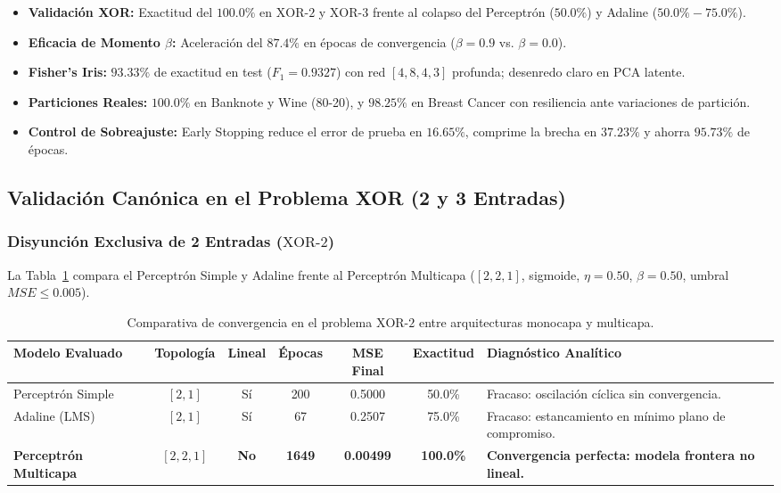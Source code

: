 \documentclass{article}
\begin{document}
\begin{takeawaybox}
\begin{itemize}
    \item \textbf{Validación XOR:} Exactitud del $100.0\%$ en $\text{XOR-2}$ y $\text{XOR-3}$ frente al colapso del Perceptrón ($50.0\%$) y Adaline ($50.0\%-75.0\%$).
    \item \textbf{Eficacia de Momento $\beta$:} Aceleración del $87.4\%$ en épocas de convergencia ($\beta=0.9$ vs. $\beta=0.0$).
    \item \textbf{Fisher's Iris:} $93.33\%$ de exactitud en test ($F_1=0.9327$) con red $[4, 8, 4, 3]$ profunda; desenredo claro en PCA latente.
    \item \textbf{Particiones Reales:} $100.0\%$ en Banknote y Wine (80-20), y $98.25\%$ en Breast Cancer con resiliencia ante variaciones de partición.
    \item \textbf{Control de Sobreajuste:} Early Stopping reduce el error de prueba en $16.65\%$, comprime la brecha en $37.23\%$ y ahorra $95.73\%$ de épocas.
\end{itemize}
\end{takeawaybox}

\subsection{Validación Canónica en el Problema XOR (2 y 3 Entradas)}

\subsubsection{Disyunción Exclusiva de 2 Entradas ($\text{XOR-2}$)}
La Tabla~\ref{tab:comp_xor2} compara el Perceptrón Simple y Adaline frente al Perceptrón Multicapa ($[2, 2, 1]$, sigmoide, $\eta = 0.50$, $\beta = 0.50$, umbral $MSE \le 0.005$).

\begin{table}[H]
\centering
\small
\caption{Comparativa de convergencia en el problema $\text{XOR-2}$ entre arquitecturas monocapa y multicapa.}
\label{tab:comp_xor2}
\begin{tabularx}{\textwidth}{l c c c c c X}
\toprule
\textbf{Modelo Evaluado} & \textbf{Topología} & \textbf{Lineal} & \textbf{Épocas} & \textbf{MSE Final} & \textbf{Exactitud} & \textbf{Diagnóstico Analítico} \\
\midrule
Perceptrón Simple & $[2, 1]$ & Sí & 200 & 0.5000 & 50.0\% & Fracaso: oscilación cíclica sin convergencia. \\
\addlinespace
Adaline (LMS) & $[2, 1]$ & Sí & 67 & 0.2507 & 75.0\% & Fracaso: estancamiento en mínimo plano de compromiso. \\
\addlinespace
\textbf{Perceptrón Multicapa} & $[2, 2, 1]$ & \textbf{No} & \textbf{1649} & \textbf{0.00499} & \textbf{100.0\%} & \textbf{Convergencia perfecta: modela frontera no lineal.} \\
\bottomrule
\end{tabularx}
\end{table}
\end{document}
